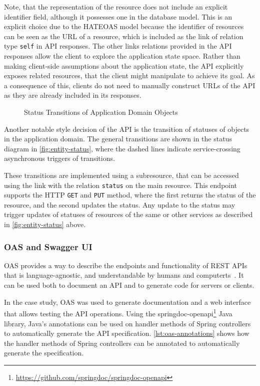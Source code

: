 Note, that the representation of the resource does not include an explicit identifier field, although it possesses one in the database model.
This is an explicit choice due to the \ac{HATEOAS} model because the identifier of resources can be seen as the \ac{URL} of a resource, which is included as the link of relation type \texttt{self} in \ac{API} responses.
The other links relations provided in the \ac{API} responses allow the client to explore the application state space.
Rather than making client-side assumptions about the application state, the \ac{API} explicitly exposes related resources, that the client might manipulate to achieve its goal.
As a consequence of this, clients do not need to manually construct \acp{URL} of the \ac{API} as they are already included in its responses.

\begin{figure}[!htb]
    \centering
    
    \caption{Status Transitions of Application Domain Objects}\label{fig:entity-status}
\end{figure}
 
Another notable style decision of the \ac{API} is the transition of statuses of objects in the application domain.
The general transitions are shown in the status diagram in \autoref{fig:entity-status}, where the dashed lines indicate service-crossing asynchronous triggers of transitions.

These transitions are implemented using a subresource, that can be accessed using the link with the relation \texttt{status} on the main resource.
This endpoint supports the \ac{HTTP} \texttt{GET} and \texttt{PUT} method, where the first returns the status of the resource, and the second updates the status.
Any update to the status may trigger updates of statuses of resources of the same or other services as described in \autoref{fig:entity-status} above.

\subsubsection{\acl{OAS} and Swagger UI}

\ac{OAS} provides a way to describe the endpoints and functionality of \ac{REST} \acp{API} that is language-agnostic, and understandable by humans and computerts~\cite{OAS}.
It can be used both to document an \ac{API} and to generate code for servers or clients.

In the case study, \ac{OAS} was used to generate documentation and a web interface that allows testing the \ac{API} operations.
Using the springdoc-openapi\footnote{\url{https://github.com/springdoc/springdoc-openapi}} Java library, Java's annotations can be used on handler methods of Spring controllers to automatically generate the \ac{API} specification.
\autoref{lst:oas-annotations} shows how the handler methods of Spring controllers can be annotated to automatically generate the specification.


